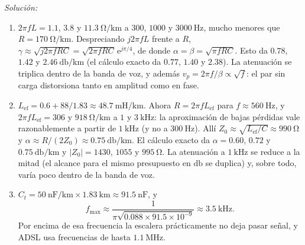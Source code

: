 \documentclass[a4paper,11pt]{article}
\newcommand{\e}{\mathrm{e}}
\newenvironment{solucion}[1][]{
\noindent \large \textsl{Solución:} \ifthenelse{\equal{#1}{}}{}{\emph{(#1)}}

\smallskip
}{
\bigskip
}
\begin{document}
\begin{solucion}
\begin{enumerate}
\item $2\pi fL=1.1$, $3.8$ y $11.3\ \unit{\ohm/\kilo\meter}$ a $300$, $1000$ y $3000\ \unit{\hertz}$, mucho menores que $R=170\ \unit{\ohm/\kilo\meter}$. Despreciando $j2\pi fL$ frente a $R$, $\gamma\approx\sqrt{j2\pi fRC}=\sqrt{2\pi fRC}\,\e^{j\pi/4}$, de donde $\alpha=\beta=\sqrt{\pi fRC}$. Esto da $0.78$, $1.42$ y $2.46\ \unit{\decibel/\kilo\meter}$ (el cálculo exacto da $0.77$, $1.40$ y $2.38$). La atenuación se triplica dentro de la banda de voz, y además $v_p=2\pi f/\beta\propto\sqrt f$: el par sin carga distorsiona tanto en amplitud como en fase.
\item $L_{\text{ef}}=0.6+88/1.83\approx48.7\ \unit{\milli\henry/\kilo\meter}$. Ahora $R=2\pi fL_{\text{ef}}$ para $f\approx560\ \unit{\hertz}$, y $2\pi fL_{\text{ef}}=306$ y $918\ \unit{\ohm/\kilo\meter}$ a $1$ y $3\ \unit{\kilo\hertz}$: la aproximación de bajas pérdidas vale razonablemente a partir de $1\ \unit{\kilo\hertz}$ (y no a $300\ \unit{\hertz}$). Allí $Z_0\approx\sqrt{L_{\text{ef}}/C}\approx990\ \unit{\ohm}$ y $\alpha\approx R/(2Z_0)\approx0.75\ \unit{\decibel/\kilo\meter}$. El cálculo exacto da $\alpha=0.60$, $0.72$ y $0.75\ \unit{\decibel/\kilo\meter}$ y $|Z_0|=1430$, $1055$ y $995\ \unit{\ohm}$. La atenuación a $1\ \unit{\kilo\hertz}$ se reduce a la mitad (el alcance para el mismo presupuesto en $\unit{\decibel}$ se duplica) y, sobre todo, varía poco dentro de la banda de voz.
\item $C_t=50\ \unit{\nano\farad/\kilo\meter}\times1.83\ \unit{\kilo\meter}\approx91.5\ \unit{\nano\farad}$, y
\begin{equation*}
f_{\max}\approx\frac{1}{\pi\sqrt{0.088\times91.5\times10^{-9}}}\approx3.5\ \unit{\kilo\hertz}.
\end{equation*}
Por encima de esa frecuencia la escalera prácticamente no deja pasar señal, y ADSL usa frecuencias de hasta $1.1\ \unit{\mega\hertz}$.
\end{enumerate}
\end{solucion}
\end{document}
